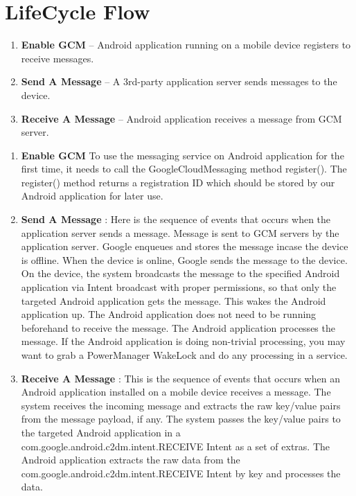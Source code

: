 \section {LifeCycle Flow}
\begin {enumerate}
   \item\textbf {Enable GCM} – Android application running on a mobile device registers to receive messages.
    \item\textbf {Send A Message} – A 3rd-party application server sends messages to the device.
   \item\textbf {Receive A Message} – Android application receives a message from GCM server.
\end {enumerate}

\begin {enumerate}
\item\textbf {Enable GCM}
To use the messaging service on Android application for the first time, it needs to call the GoogleCloudMessaging method register(). The register() method returns a registration ID which should be stored by our Android application for later use.

   \item\textbf { Send A Message} : Here is the sequence of events that occurs when the application server sends a message.
        Message is sent to GCM servers by the application server.
        Google enqueues and stores the message incase the device is offline.
        When the device is online, Google sends the message to the device.
        On the device, the system broadcasts the message to the specified Android application via Intent broadcast with proper permissions, so that only the targeted Android application gets the message. This wakes the Android application up. The Android application does not need to be running beforehand to receive the message.
        The Android application processes the message. If the Android application is doing non-trivial processing, you may want to grab a PowerManager WakeLock and do any processing in a service.

   \item\textbf { Receive A Message} : This is the sequence of events that occurs when an Android application installed on a mobile device receives a message.
        The system receives the incoming message and extracts the raw key/value pairs from the message payload, if any.
        The system passes the key/value pairs to the targeted Android application in a com.google.android.c2dm.intent.RECEIVE Intent as a set of extras.
        The Android application extracts the raw data from the com.google.android.c2dm.intent.RECEIVE Intent by key and processes the data.
\end {enumerate}